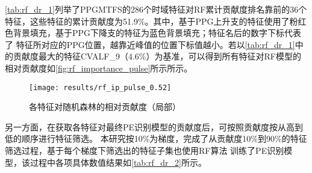 \autoref{tab:rf_dr_1}列举了PPGMTFS的286个时域特征对RF累计贡献度排名靠前的36个特征，这些特征的累计贡献度为51.9\%。其中，基于PPG上升支的特征使用了粉红色背景填充，基于PPG下降支的特征为蓝色背景填充；特征名后的数字下标代表了
特征所对应的PPG位置，越靠近峰值的位置下标值越小。若以\autoref{tab:rf_dr_1}中的贡献度最大的特征CVALF\_9（4.6\%）为基准，可以得到所有特征对RF模型的相对贡献度如\autoref{fig:rf_importance_pulse}所示所示。

\begin{figure}[htbp]
      \centering
      \texttt{[image: results/rf\_ip\_pulse\_0.52]}
      \caption[各特征对随机森林的相对贡献度（局部）]{\label{fig:rf_importance_pulse}各特征对随机森林的相对贡献度（局部）}
\end{figure}

另一方面，在获取各特征对最终PE识别模型的贡献度后，可按照贡献度按从高到低的顺序进行特征筛选。
本研究按10\%为梯度，完成了从贡献度10\%到90\%的特征筛选过程，基于每个梯度下筛选出的特征子集也使用RF算法
训练了PE识别模型，该过程中各项具体数值结果如\autoref{tab:rf_dr_2}所示。

